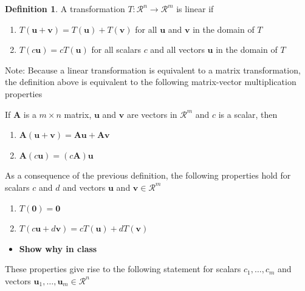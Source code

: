 \documentclass[
]{book}
\providecommand{\tightlist}{%
  \setlength{\itemsep}{0pt}\setlength{\parskip}{0pt}}
\theoremstyle{definition}
\newtheorem{definition}{Definition}[chapter]
\theoremstyle{definition}
\theoremstyle{definition}
\theoremstyle{definition}
\theoremstyle{remark}
\begin{document}
\begin{definition}

A transformation \(T:\mathcal{R}^n \rightarrow \mathcal{R}^m\) is linear if

\begin{enumerate}
\def\labelenumi{\arabic{enumi})}
\item
  \(T(\mathbf{u} + \mathbf{v}) = T(\mathbf{u}) + T(\mathbf{v})\) for all \(\mathbf{u}\) and \(\mathbf{v}\) in the domain of \(T\)
\item
  \(T(c \mathbf{u}) = c T(\mathbf{u})\) for all scalars \(c\) and all vectors \(\mathbf{u}\) in the domain of \(T\)
\end{enumerate}

\end{definition}

Note: Because a linear transformation is equivalent to a matrix transformation, the definition above is equivalent to the following matrix-vector multiplication properties

If \(\mathbf{A}\) is a \(m \times n\) matrix, \(\mathbf{u}\) and \(\mathbf{v}\) are vectors in \(\mathcal{R}^m\) and \(c\) is a scalar, then

\begin{enumerate}
\def\labelenumi{\arabic{enumi})}
\tightlist
\item
  \(\mathbf{A} (\mathbf{u} + \mathbf{v}) = \mathbf{A} \mathbf{u} + \mathbf{A} \mathbf{v}\)
\item
  \(\mathbf{A} (c \mathbf{u}) = (c \mathbf{A}) \mathbf{u}\)
\end{enumerate}

As a consequence of the previous definition, the following properties hold for scalars \(c\) and \(d\) and vectors \(\mathbf{u}\) and \(\mathbf{v} \in \mathcal{R}^m\)

\begin{enumerate}
\def\labelenumi{\arabic{enumi})}
\setcounter{enumi}{2}
\tightlist
\item
  \(T(\mathbf{0}) = \mathbf{0}\)
\item
  \(T(c \mathbf{u} + d \mathbf{v}) = c T(\mathbf{u}) + d T(\mathbf{v})\)
\end{enumerate}

\begin{itemize}
\tightlist
\item
  \textbf{Show why in class}
\end{itemize}

These properties give rise to the following statement for scalars \(c_1, \ldots, c_m\) and vectors \(\mathbf{u}_1, \ldots, \mathbf{u}_m \in \mathcal{R}^n\)
\end{document}
